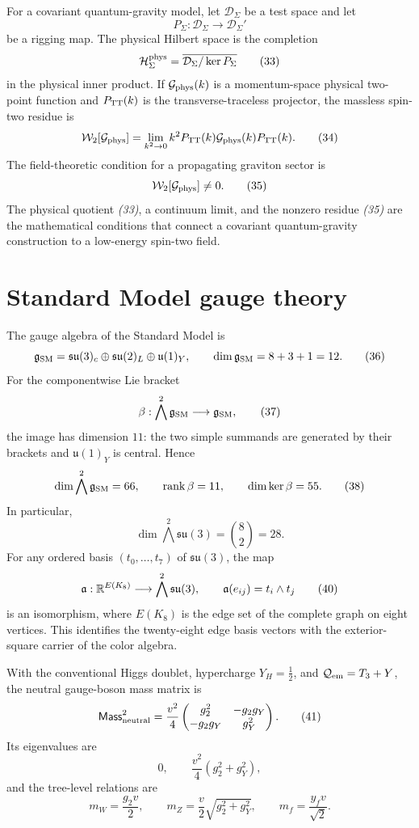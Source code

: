 For a covariant quantum-gravity model, let $\mathcal D_\Sigma$ be a test
space and let
\[
P_\Sigma:\mathcal D_\Sigma\longrightarrow\mathcal D_\Sigma'
\tag{32}
\]
be a rigging map.  The physical Hilbert space is the completion
\[
\mathcal H_\Sigma^{\rm phys}
=\overline{\mathcal D_\Sigma/\ker P_\Sigma}
\tag{33}
\]
in the physical inner product.  If $\mathcal G_{\rm phys}(k)$ is a
momentum-space physical two-point function and $P_{\rm TT}(k)$ is the
transverse-traceless projector, the massless spin-two residue is
\[
\mathcal W_2[\mathcal G_{\rm phys}]
=\lim_{k^2\to0}
k^2P_{\rm TT}(k)\mathcal G_{\rm phys}(k)P_{\rm TT}(k).
\tag{34}
\]
The field-theoretic condition for a propagating graviton sector is
\[
\mathcal W_2[\mathcal G_{\rm phys}]\ne0.
\tag{35}
\]
The physical quotient \emph{(33)}, a continuum limit, and the nonzero
residue \emph{(35)} are the mathematical conditions that connect a
covariant quantum-gravity construction to a low-energy spin-two field.

\section{Standard Model gauge theory}

The gauge algebra of the Standard Model is
\[
\mathfrak g_{\rm SM}
=\mathfrak{su}(3)_c\oplus\mathfrak{su}(2)_L\oplus\mathfrak u(1)_Y,
\qquad
\dim\mathfrak g_{\rm SM}=8+3+1=12.
\tag{36}
\]
For the componentwise Lie bracket
\[
\beta:\bigwedge^2\mathfrak g_{\rm SM}\longrightarrow\mathfrak g_{\rm SM},
\tag{37}
\]
the image has dimension $11$: the two simple summands are generated by
their brackets and $\mathfrak u(1)_Y$ is central.  Hence
\[
\dim\bigwedge^2\mathfrak g_{\rm SM}=66,\qquad
\operatorname{rank}\beta=11,\qquad
\dim\ker\beta=55.
\tag{38}
\]
In particular,
\[
\dim\bigwedge^2\mathfrak{su}(3)=\binom82=28.
\tag{39}
\]
For any ordered basis $(t_0,\ldots,t_7)$ of $\mathfrak{su}(3)$, the map
\[
\mathfrak a:\mathbb R^{E(K_8)}\longrightarrow\bigwedge^2\mathfrak{su}(3),
\qquad
\mathfrak a(e_{ij})=t_i\wedge t_j
\tag{40}
\]
is an isomorphism, where $E(K_8)$ is the edge set of the complete graph on
eight vertices.  This identifies the twenty-eight edge basis vectors with
the exterior-square carrier of the color algebra.

With the conventional Higgs doublet, hypercharge $Y_H=\frac12$, and
$\mathcal Q_{\rm em}=T_3+Y$, the neutral gauge-boson mass matrix is
\[
\mathsf{Mass}_{\rm neutral}^2
=\frac{v^2}{4}
\begin{pmatrix}
g_2^2&-g_2g_Y\\
-g_2g_Y&g_Y^2
\end{pmatrix}.
\tag{41}
\]
Its eigenvalues are
\[
0,\qquad\frac{v^2}{4}(g_2^2+g_Y^2),
\tag{42}
\]
and the tree-level relations are
\[
m_W=\frac{g_2v}{2},\qquad
m_Z=\frac{v}{2}\sqrt{g_2^2+g_Y^2},\qquad
m_f=\frac{y_fv}{\sqrt2}.
\tag{43}
\]

